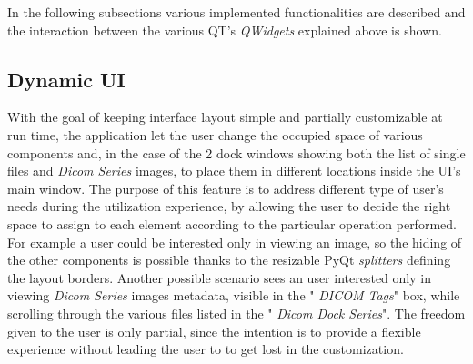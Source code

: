 \documentclass[conference]{IEEEtran}
\begin{document}
In the following subsections various implemented functionalities are described and the interaction between the various QT's  \textit{QWidgets} explained above is shown.

\subsection{Dynamic UI}

With the goal of keeping interface layout simple and partially customizable at run time, the application let the user change the occupied space of various components and, in the case of the 2 dock windows showing both the list of single files and  \textit{Dicom Series} images, to place them in different locations inside the UI's main window. The purpose of this feature is to address different type of user's needs during the utilization experience, by allowing the user to decide the right space to assign to each element according to the particular operation performed. For example a user could be interested only in viewing an image, so the hiding of the other components is possible thanks to the resizable PyQt  \textit{splitters} defining the layout borders. Another possible scenario sees an user interested only in viewing  \textit{Dicom Series} images metadata, visible in the " \textit{DICOM Tags}" box, while scrolling through the various files listed in the " \textit{Dicom Dock Series}". The freedom given to the user is only partial, since the intention is to provide a flexible experience without leading the user to to get lost in the customization.
\end{document}
